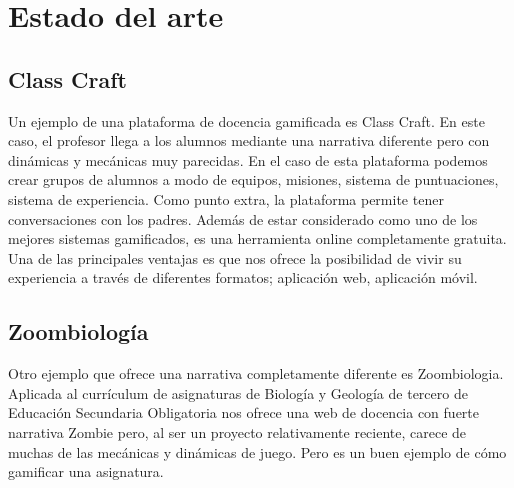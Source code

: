 \setcounter{chapter}{7}
\setcounter{section}{0}
\setcounter{subsection}{0}
\chapter{Estado del arte}

\section{Class Craft \cite{ClassCraft}}

Un ejemplo de una plataforma de docencia gamificada es Class Craft. En este caso, el profesor llega a los alumnos mediante una narrativa diferente pero con dinámicas y mecánicas muy parecidas. En el caso de esta plataforma podemos crear grupos de alumnos a modo de equipos, misiones, sistema de puntuaciones, sistema de experiencia. Como punto extra, la plataforma permite tener conversaciones con los padres. Además de estar considerado como uno de los mejores sistemas gamificados, es una herramienta online completamente gratuita.\\

Una de las principales ventajas es que nos ofrece la posibilidad de vivir su experiencia a través de diferentes formatos; aplicación web, aplicación móvil.

\section{Zoombiología \cite{Zoombiologia}}

Otro ejemplo que ofrece una narrativa completamente diferente es Zoombiologia. Aplicada al currículum de asignaturas de Biología y Geología de tercero de Educación Secundaria Obligatoria nos ofrece una web de docencia con fuerte narrativa Zombie pero, al ser un proyecto relativamente reciente, carece de muchas de las mecánicas y dinámicas de juego. Pero es un buen ejemplo de cómo gamificar una asignatura.

